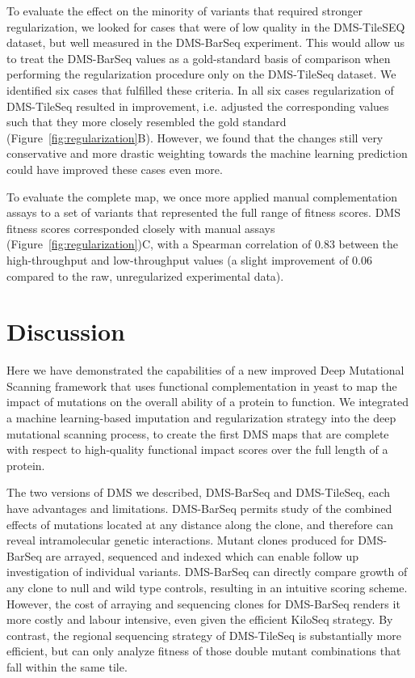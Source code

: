 To evaluate the effect on the minority of variants that required stronger regularization, we looked for cases that were of low quality in the DMS-TileSEQ dataset, but well measured in the DMS-BarSeq experiment. This would allow us to treat the DMS-BarSeq values as a gold-standard basis of comparison when performing the regularization procedure only on the DMS-TileSeq dataset. We identified six cases that fulfilled these criteria. In all six cases regularization of DMS-TileSeq resulted in improvement, i.e. adjusted the corresponding values such that they more closely resembled the gold standard (Figure~\ref{fig:regularization}B). However, we found that the changes still very conservative and more drastic weighting towards the machine learning prediction could have improved these cases even more.

To evaluate the complete map, we once more applied manual complementation assays to a set of variants that represented the full range of fitness scores.  DMS fitness scores corresponded closely with manual assays (Figure~\ref{fig:regularization})C, with a Spearman correlation of 0.83 between the high-throughput and low-throughput values (a slight improvement of 0.06 compared to the raw, unregularized experimental data).


\section{Discussion}

Here we have demonstrated the capabilities of a new improved Deep Mutational Scanning framework that uses functional complementation in yeast to map the impact of mutations on the overall ability of a protein to function. We integrated a machine learning-based imputation and regularization strategy into the deep mutational scanning process, to create the first DMS maps that are complete with respect to high-quality functional impact scores over the full length of a protein. 

The two versions of DMS we described, DMS-BarSeq and DMS-TileSeq, each have advantages and limitations. DMS-BarSeq permits study of the combined effects of mutations located at any distance along the clone, and therefore can reveal intramolecular genetic interactions.  Mutant clones produced for DMS-BarSeq are arrayed, sequenced and indexed which can enable follow up investigation of individual variants. DMS-BarSeq can directly compare growth of any clone to null and wild type controls, resulting in an intuitive scoring scheme. However, the cost of arraying and sequencing clones for DMS-BarSeq renders it more costly and labour intensive, even given the efficient KiloSeq strategy. By contrast, the regional sequencing strategy of DMS-TileSeq is substantially more efficient, but can only analyze fitness of those double mutant combinations that fall within the same tile. 

